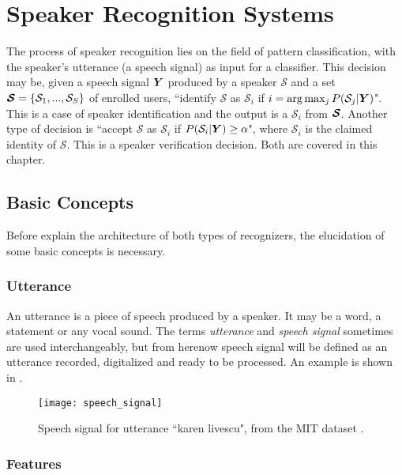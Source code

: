 \chapter{Speaker Recognition Systems}
\label{ch:speaker-recognition-system}

The process of speaker recognition lies on the field of pattern classification, with the speaker's utterance (a speech signal) as input for a classifier. This decision may be, given a speech signal $\boldsymbol{Y}$ produced by a speaker $\mathcal{S}$ and a set $\boldsymbol{\mathcal{S}} = \{\mathcal{S}_1, ..., \mathcal{S}_S\}$ of enrolled users, ``identify $\mathcal{S}$ as $\mathcal{S}_i$ if $i = \arg\max_j P(\mathcal{S}_j|\boldsymbol{Y})$". This is a case of speaker identification and the output is a $\mathcal{S}_i$ from $\boldsymbol{\mathcal{S}}$. Another type of decision is ``accept $\mathcal{S}$ as $\mathcal{S}_i$ if $P(\mathcal{S}_i|\boldsymbol{Y}) \geq \alpha$", where $\mathcal{S}_i$ is the claimed identity of $\mathcal{S}$. This is a speaker verification decision. Both are covered in this chapter.

\section{Basic Concepts}

Before explain the architecture of both types of recognizers, the elucidation of some basic concepts is necessary.

\subsection{Utterance}

An utterance is a piece of speech produced by a speaker. It may be a word, a statement or any vocal sound. The terms \emph{utterance} and \emph{speech signal} sometimes are used interchangeably, but from herenow speech signal will be defined as an utterance recorded, digitalized and ready to be processed. An example is shown in .

\begin{figure}[ht]
    \centering
    \texttt{[image: speech\_signal]}
    \caption{Speech signal for utterance ``karen livescu", from the MIT dataset .}
    \label{fig:speech_signal}
\end{figure}

\subsection{Features}

